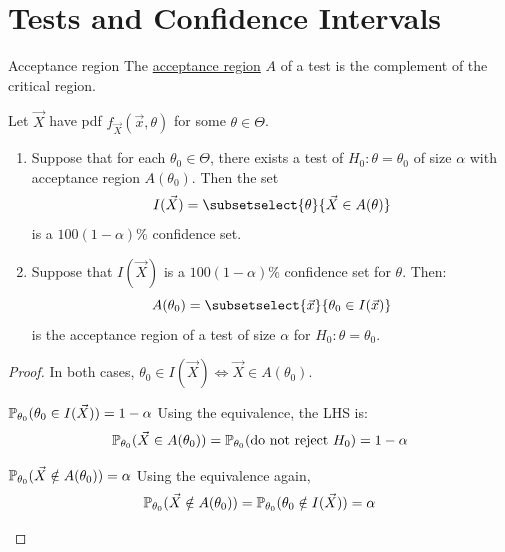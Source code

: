 \documentclass[../Main.tex]{subfiles}
\begin{document}
\section{Tests and Confidence Intervals}
\begin{definition}{Acceptance region}
    The \underline{acceptance region} $A$ of a test is the complement of the critical region.
\end{definition}
\begin{theorem}
    Let $\vec{X}$ have pdf $f_{\vec{X}}(\vec{x}, \theta)$ for some $\theta \in \Theta$.
    \begin{enumerate}
        \item Suppose that for each $\theta_0 \in \Theta$, there exists a test of $H_0: \theta = \theta_0$ of size $\alpha$ with acceptance region $A(\theta_0)$. Then the set
            \begin{equation*}
                I(\vec{X}) = \subsetselect{\theta}{\vec{X} \in A(\theta)}
            \end{equation*}
            is a $100(1-\alpha)\%$ confidence set.
        \item Suppose that $I(\vec{X})$ is a $100(1-\alpha)\%$ confidence set for $\theta$. Then:
            \begin{equation*}
                A(\theta_0) = \subsetselect{\vec{x}}{\theta_0 \in I(\vec{x})}
            \end{equation*}
            is the acceptance region of a test of size $\alpha$ for $H_0 : \theta = \theta_0$.
    \end{enumerate}
    \label{thmTestsCIs}
\end{theorem}
\begin{proof}
    In both cases, $\theta_0 \in I(\vec{X}) \iff \vec{X} \in A(\theta_0)$.

    \begin{subproof}{$\P_{\theta_0}(\theta_0 \in I(\vec{X})) = 1-\alpha$}
        Using the equivalence, the LHS is:
        \begin{equation*}
            \P_{\theta_0}(\vec{X} \in A(\theta_0)) = \P_{\theta_0}(\text{do not reject $H_0$}) = 1-\alpha
        \end{equation*}
    \end{subproof}
    \begin{subproof}{$\P_{\theta_0}(\vec{X} \notin A(\theta_0)) = \alpha$}
        Using the equivalence again,
        \begin{equation*}
            \P_{\theta_0}(\vec{X} \notin A(\theta_0)) = \P_{\theta_0}(\theta_0 \notin I(\vec{X})) = \alpha
        \end{equation*}
    \end{subproof}
\end{proof}
\end{document}
